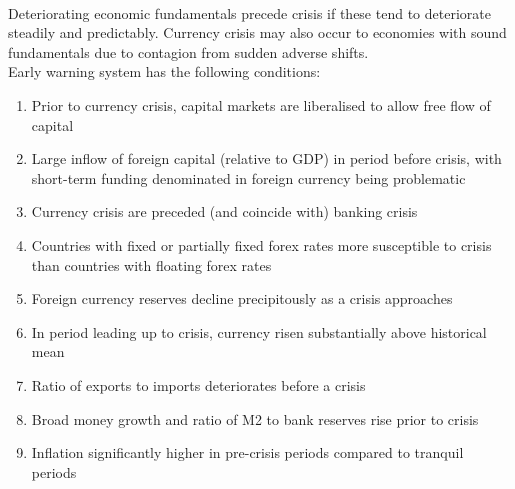 \begin{remark} \\
Deteriorating economic fundamentals precede crisis if these tend to deteriorate steadily and predictably. Currency crisis may also occur to economies with sound fundamentals due to contagion from sudden adverse shifts.\\
Early warning system has the following conditions:
\begin{enumerate}[label=\roman*.]
\setlength{\itemsep}{0pt}
\item Prior to currency crisis, capital markets are liberalised to allow free flow of capital
\item Large inflow of foreign capital (relative to GDP) in period before crisis, with short-term funding denominated in foreign currency being problematic
\item Currency crisis are preceded (and coincide with) banking crisis
\item Countries with fixed or partially fixed forex rates more susceptible to crisis than countries with floating forex rates
\item Foreign currency reserves decline precipitously as a crisis approaches
\item In period leading up to crisis, currency risen substantially above historical mean
\item Ratio of exports to imports deteriorates before a crisis
\item Broad money growth and ratio of M2 to bank reserves rise prior to crisis
\item Inflation significantly higher in pre-crisis periods compared to tranquil periods
\end{enumerate}
\end{remark}
